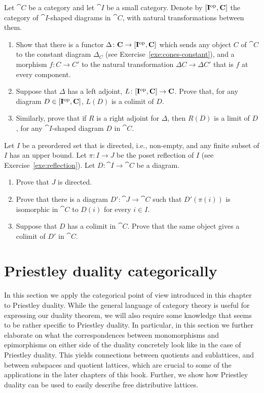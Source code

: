 \begin{exercise}\label{exe:limit-adjunction}
  Let $\cat{C}$ be a category and let $\cat{I}$ be a small category. Denote by $[\mathbf{I}^{\mathrm{op}}, \mathbf{C}]$ the category of $\cat{I}$-shaped diagrams in $\cat{C}$, with natural transformations between them.
  \begin{enumerate}
  \item Show that there is a functor $\Delta \colon \mathbf{C} \to [\mathbf{I}^{\mathrm{op}}, \mathbf{C}]$ which sends any object $C$ of $\cat{C}$ to the constant diagram $\Delta_C$ (see Exercise~\ref{exe:cones-constant}), and a morphism $f \colon C \to C'$ to the natural transformation $\Delta C \to \Delta C'$ that is $f$ at every component.
    
  \item Suppose that $\Delta$ has a left adjoint, $L \colon [\mathbf{I}^{\mathrm{op}}, \mathbf{C}] \to \mathbf{C}$. Prove that, for any diagram $D \in [\mathbf{I}^{\mathrm{op}}, \mathbf{C}]$, $L(D)$ is a colimit of $D$.
  \item Similarly, prove that if $R$ is a right adjoint for $\Delta$, then $R(D)$ is a limit of $D$, for any $\cat{I}$-shaped diagram $D$ in $\cat{C}$.
  \end{enumerate}
\end{exercise}
\begin{exercise}\label{exe:preorder-or-poset-colimit}
Let $I$ be a preordered set that is directed, i.e., non-empty, and any finite subset of $I$ has an upper bound. Let $\pi \colon I \to J$ be the poset reflection of $I$ (see Exercise~\ref{exe:reflection}). Let $D \colon \cat{I} \to \cat{C}$ be a diagram.
\begin{enumerate}
  \item Prove that $J$ is directed.
  \item Prove that there is a diagram $D' \colon \cat{J} \to \cat{C}$ such that $D'(\pi(i))$ is isomorphic in $\cat{C}$ to $D(i)$ for every $i \in I$.
  \item Suppose that $D$ has a colimit in $\cat{C}$. Prove that the same object gives a colimit of $D'$ in $\cat{C}$.
\end{enumerate}
\end{exercise}

\section{Priestley duality categorically}\label{sec:duality-categorically}
In this section we apply the categorical point of view introduced in this chapter to Priestley duality. While the general language of category theory is useful for expressing our duality theorem, we will also require some knowledge that seems to be rather specific to Priestley duality.
In particular, in this section we further elaborate on what the correspondences between monomorphisms and epimorphisms on either side of the duality concretely look like in the case of Priestley duality. This yields connections between quotients and sublattices, and between subspaces and quotient lattices, which are crucial to some of the applications in the later chapters of this book. Further, we show how Priestley duality can be used to easily describe free distributive lattices.

